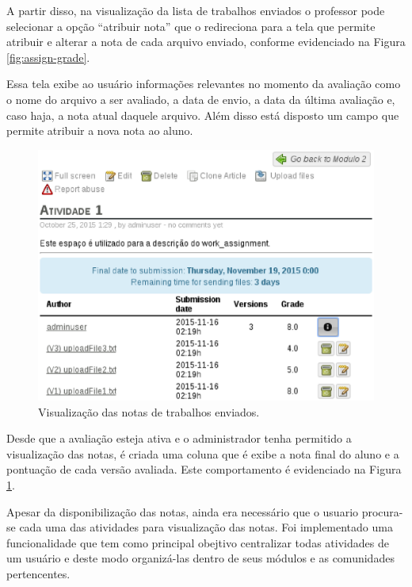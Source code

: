 A partir disso, na visualização da lista de trabalhos enviados o professor pode selecionar a opção ``atribuir nota'' que o redireciona para a tela que permite atribuir e alterar a nota de cada arquivo enviado, conforme evidenciado na Figura \ref{fig:assign-grade}.

Essa tela exibe ao usuário informações relevantes no momento da avaliação como o nome do arquivo a ser avaliado, a data de envio, a data da última avaliação e, caso haja, a nota atual daquele arquivo. Além disso está disposto um campo que permite atribuir a nova nota ao aluno.

\begin{figure}[h]
    \centering
    \includegraphics[keepaspectratio=true,scale=0.6]
      {figuras/visualiza-notas.eps}
    \caption{Visualização das notas de trabalhos enviados.}
    \label{fig:visualiza-notas}
\end{figure}

Desde que a avaliação esteja ativa e o administrador tenha permitido a visualização das notas, é criada uma coluna que é exibe a nota final do aluno e a pontuação de cada versão avaliada. Este comportamento é evidenciado na Figura \ref{fig:visualiza-notas}.

Apesar da disponibilização das notas, ainda era necessário que o usuario procura-se cada uma das atividades para visualização das notas. Foi implementado uma funcionalidade que tem como principal obejtivo centralizar todas atividades de um usuário e deste modo organizá-las dentro de seus módulos e as comunidades pertencentes.

